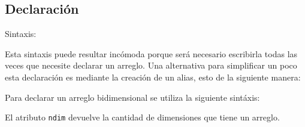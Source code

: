 \subsection{Declaración}

Sintaxis:

\begin{Shaded}
\begin{Highlighting}[]
\OperatorTok{=}\NormalTok{ numpy.array([}\NormalTok{, }\NormalTok{, }\NormalTok{, }\NormalTok{, }\NormalTok{])}
\end{Highlighting}
\end{Shaded}

Esta sintaxis puede resultar incómoda porque será necesario escribirla
todas las veces que necesite declarar un arreglo. Una alternativa para
simplificar un poco esta declaración es mediante la creación de un
alias, esto de la siguiente manera:

\begin{Shaded}
\begin{Highlighting}[]
\OperatorTok{=}\NormalTok{ np.array([}\NormalTok{, }\NormalTok{, }\NormalTok{, }\NormalTok{, }\NormalTok{])}
\end{Highlighting}
\end{Shaded}

Para declarar un arreglo bidimensional se utiliza la siguiente sintáxis:

\begin{Shaded}
\begin{Highlighting}[]
\OperatorTok{=}\NormalTok{ np.array([[}\NormalTok{, }\NormalTok{, }\NormalTok{], [}\NormalTok{, }\NormalTok{, }\NormalTok{]])}
\end{Highlighting}
\end{Shaded}

El atributo \texttt{ndim} devuelve la cantidad de dimensiones que tiene
un arreglo.

\begin{Shaded}
\begin{Highlighting}[]
\OperatorTok{=}\NormalTok{ np.array([[}\NormalTok{, }\NormalTok{, }\NormalTok{], [}\NormalTok{, }\NormalTok{, }\NormalTok{]])}
\end{Highlighting}
\end{Shaded}

